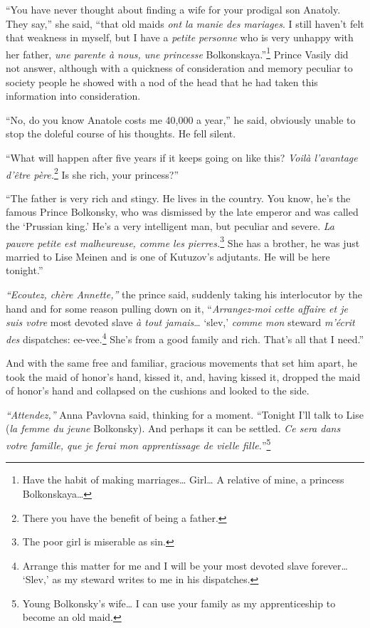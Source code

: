 ``You have never thought about finding a wife for your prodigal son
Anatoly. They say,'' she said, ``that old maids \textit{ont la manie
  des mariages}. I still haven't felt that weakness in myself, but I
have a \textit{petite personne} who is very unhappy with her father,
\textit{une parente \`a nous, une princesse}
Bolkonskaya.''\footnote{Have the habit of making marriages\ldots{}
  Girl\ldots{} A relative of mine, a princess Bolkonskaya\ldots}
Prince Vasily did not answer, although with a quickness of
consideration and memory peculiar to society people he showed with a
nod of the head that he had taken this information into consideration.

``No, do you know Anatole costs me 40,000 a year,'' he said, obviously
unable to stop the doleful course of his thoughts. He fell silent.

``What will happen after five years if it keeps going on like this?
\textit{Voil\`a l'avantage d'\^etre p\`ere.}\footnote{There you have
  the benefit of being a father.} Is she rich, your
princess?''

``The father is very rich and stingy. He lives in the country. You
know, he's the famous Prince Bolkonsky, who was dismissed by the late
emperor and was called the `Prussian king.' He's a very intelligent
man, but peculiar and severe. \textit{La pauvre petite est
  malheureuse, comme les pierres.}\footnote{The poor girl is miserable
  as sin.} She has a brother, he was just married to Lise Meinen and
is one of Kutuzov's adjutants. He will be here tonight.''

\textit{``Ecoutez, ch\`ere Annette,''} the prince said, suddenly
taking his interlocutor by the hand and for some reason pulling down
on it, ``\textit{Arrangez-moi cette affaire et je suis votre} most
devoted slave \textit{\`a tout jamais}\ldots{} `slev,' \textit{comme
  mon} steward \textit{m'\'ecrit des} dispatches:
ee-vee.\footnote{Arrange this matter for me and I will be your most
  devoted slave forever\ldots{} `Slev,' as my steward writes to me in
  his dispatches.} She's from a good family and rich. That's all that
I need.''

And with the same free and familiar, gracious movements that set him
apart, he took the maid of honor's hand, kissed it, and, having
kissed it, dropped the maid of honor's hand and collapsed on the
cushions and looked to the side.

\textit{``Attendez,''} Anna Pavlovna said, thinking for a
moment. ``Tonight I'll talk to Lise (\textit{la femme du jeune}
Bolkonsky). And perhaps it can be settled. \textit{Ce sera dans votre
  famille, que je ferai mon apprentissage de vielle
  fille.}''\footnote{Young Bolkonsky's wife\ldots{} I can use your
  family as my apprenticeship to become an old maid.}

